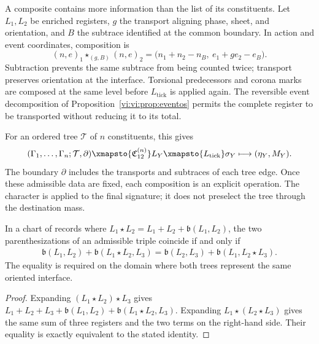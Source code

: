 A composite contains more information than the list of its
constituents. Let \(L_1,L_2\) be enriched registers, \(g\) the
transport aligning phase, sheet, and orientation, and \(B\) the subtrace
identified at the common boundary. In action and
event coordinates, composition is
\begin{equation}
 (n,e)_1\star_{(g,B)}(n,e)_2
 =\bigl(n_1+n_2-n_B,\ e_1+ge_2-e_B\bigr).
 \label{vi:vi:eq:composicion-frontera}
\end{equation}
Subtraction prevents the same subtrace from being counted twice; transport
preserves orientation at the interface. Torsional predecessors and
corona marks are composed at the same level before
\(L_{\mathrm{tick}}\) is applied again. The reversible event decomposition
of Proposition~\ref{vi:vi:prop:eventos} permits the complete register
to be transported without reducing it to its total.

For an ordered tree \(\mathcal T\) of \(n\) constituents, this gives
\begin{equation}
 (\Gamma_1,\ldots,\Gamma_n;\mathcal T,\partial)
 \xmapsto{\mathfrak C_{12}^{(n)}}L_Y
 \xmapsto{L_{\mathrm{tick}}}\sigma_Y
 \longmapsto (\eta_Y,M_Y).
 \label{vi:vi:eq:cadena-compuesto}
\end{equation}
The boundary \(\partial\) includes the transports and subtraces of each
tree edge. Once these admissible data are fixed, each composition
is an explicit operation. The character is applied to the final signature;
it does not preselect the tree through the destination mass.

\begin{proposition}
\label{vi:vi:prop:cociclo-compuesto}
In a chart of records where
\(L_1\star L_2=L_1+L_2+\mathfrak b(L_1,L_2)\), the two
parenthesizations of an admissible triple coincide if and only if
\begin{align*}
 \mathfrak b(L_1,L_2)+\mathfrak b(L_1\star L_2,L_3)
 =\mathfrak b(L_2,L_3)+\mathfrak b(L_1,L_2\star L_3).
\end{align*}
The equality is required on the domain where both trees represent the
same oriented interface.
\end{proposition}
\begin{proof}
Expanding \((L_1\star L_2)\star L_3\) gives
\(L_1+L_2+L_3+\mathfrak b(L_1,L_2)+\mathfrak b(L_1\star L_2,L_3)\).
Expanding \(L_1\star(L_2\star L_3)\) gives the same sum of three
registers and the two terms on the right-hand side. Their equality is
exactly equivalent to the stated identity.
\end{proof}

